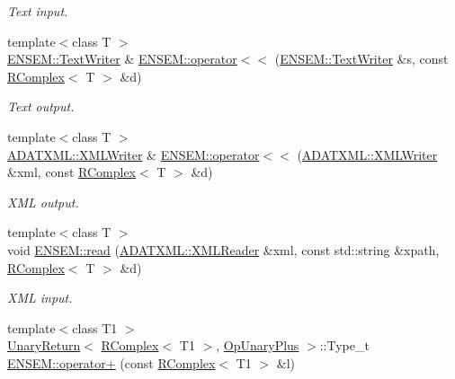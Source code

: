 \begin{DoxyCompactItemize}
\begin{DoxyCompactList}\small\item\em Text input. \end{DoxyCompactList}\item 
{\footnotesize template$<$class T $>$ }\\\mbox{\hyperlink{classENSEM_1_1TextWriter}{E\+N\+S\+E\+M\+::\+Text\+Writer}} \& \mbox{\hyperlink{group__rcomplex_gaddd3f3bfef7fda1dcb327c57c20891bb}{E\+N\+S\+E\+M\+::operator$<$$<$}} (\mbox{\hyperlink{classENSEM_1_1TextWriter}{E\+N\+S\+E\+M\+::\+Text\+Writer}} \&s, const \mbox{\hyperlink{classENSEM_1_1RComplex}{R\+Complex}}$<$ T $>$ \&d)
\begin{DoxyCompactList}\small\item\em Text output. \end{DoxyCompactList}\item 
{\footnotesize template$<$class T $>$ }\\\mbox{\hyperlink{classADATXML_1_1XMLWriter}{A\+D\+A\+T\+X\+M\+L\+::\+X\+M\+L\+Writer}} \& \mbox{\hyperlink{group__rcomplex_gaa63187dcbe17285c7d04fd9887d97b6a}{E\+N\+S\+E\+M\+::operator$<$$<$}} (\mbox{\hyperlink{classADATXML_1_1XMLWriter}{A\+D\+A\+T\+X\+M\+L\+::\+X\+M\+L\+Writer}} \&xml, const \mbox{\hyperlink{classENSEM_1_1RComplex}{R\+Complex}}$<$ T $>$ \&d)
\begin{DoxyCompactList}\small\item\em X\+ML output. \end{DoxyCompactList}\item 
{\footnotesize template$<$class T $>$ }\\void \mbox{\hyperlink{group__rcomplex_ga4e957daaafbfd0e1b97883627dddd8f7}{E\+N\+S\+E\+M\+::read}} (\mbox{\hyperlink{classADATXML_1_1XMLReader}{A\+D\+A\+T\+X\+M\+L\+::\+X\+M\+L\+Reader}} \&xml, const std\+::string \&xpath, \mbox{\hyperlink{classENSEM_1_1RComplex}{R\+Complex}}$<$ T $>$ \&d)
\begin{DoxyCompactList}\small\item\em X\+ML input. \end{DoxyCompactList}\item 
{\footnotesize template$<$class T1 $>$ }\\\mbox{\hyperlink{structENSEM_1_1UnaryReturn}{Unary\+Return}}$<$ \mbox{\hyperlink{classENSEM_1_1RComplex}{R\+Complex}}$<$ T1 $>$, \mbox{\hyperlink{structENSEM_1_1OpUnaryPlus}{Op\+Unary\+Plus}} $>$\+::Type\+\_\+t \mbox{\hyperlink{group__rcomplex_ga7b4d2aabc48b7a45a328cf586ea8d5f0}{E\+N\+S\+E\+M\+::operator+}} (const \mbox{\hyperlink{classENSEM_1_1RComplex}{R\+Complex}}$<$ T1 $>$ \&l)

\end{DoxyCompactItemize}
